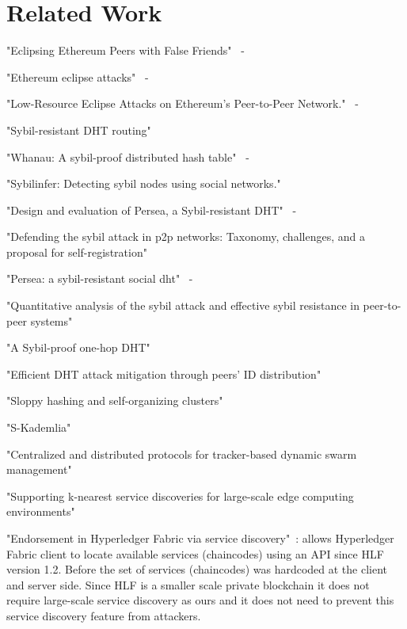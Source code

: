 
\section{Related Work}

"Eclipsing Ethereum Peers with False Friends"~\cite{henningsen2019eclipsing} - 

"Ethereum eclipse attacks"~\cite{wust2016ethereum} - 

"Low-Resource Eclipse Attacks on Ethereum's Peer-to-Peer Network."~\cite{marcus2018low} - 

"Sybil-resistant DHT routing"~\cite{danezis2005sybil}

"Whanau: A sybil-proof distributed hash table"~\cite{lesniewski2010whanau} - 

"Sybilinfer: Detecting sybil nodes using social networks."~\cite{danezis2009sybilinfer}

"Design and evaluation of Persea, a Sybil-resistant DHT"~\cite{al2014design} - 

"Defending the sybil attack in p2p networks: Taxonomy, challenges, and a proposal for self-registration"~\cite{dinger2006defending}

"Persea: a sybil-resistant social dht"~\cite{al2013persea} - 

"Quantitative analysis of the sybil attack and effective sybil resistance in peer-to-peer systems"~\cite{jetter2010quantitative}

"A Sybil-proof one-hop DHT"~\cite{lesniewski2008sybil}

"Efficient DHT attack mitigation through peers' ID distribution"~\cite{cholez2010efficient}

"Sloppy hashing and self-organizing clusters"~\cite{freedman2003sloppy}

"S-Kademlia"~\cite{pecori2016s}

"Centralized and distributed protocols for tracker-based dynamic swarm management"~\cite{dan2012centralized}

"Supporting k-nearest service discoveries for large-scale edge computing environments"~\cite{teranishi2018supporting}

"Endorsement in Hyperledger Fabric via service discovery"~\cite{manevich2019endorsement}: allows Hyperledger Fabric client to locate available services (chaincodes) using an API since HLF version 1.2. Before the set of services (chaincodes) was hardcoded at the client and server side. Since HLF is a smaller scale private blockchain it does not require large-scale service discovery as ours and it does not need to prevent this service discovery feature from attackers.

